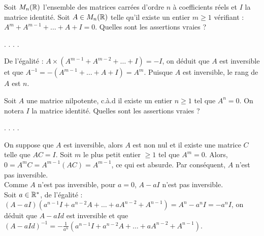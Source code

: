 \begin{question}
Soit $ M_n(\mathbb{R})$ l'ensemble des matrices carrées d'ordre $n$  à coefficients réels  et $I$ la matrice identité.
Soit $A \in M_n(\mathbb{R})$ telle qu'il existe un entier  $m \ge 1$ vérifiant :  $A^m+A^{m-1}+ \dots + A + I = 0$. Quelles sont les assertions vraies ?
\begin{answers}  
.
.
.
.
\end{answers}
\begin{explanations} De l'égalité : $A \times  (A^{m-1}+A^{m-2}+ \dots + I)= -I$, on déduit que  $A$ est inversible et que $A^{-1}=-(A^{m-1}+ \dots + A+I)=A^m$. Puisque $A$ est inversible, le rang de $A$ est $n$.
\end{explanations}
\end{question}

\begin{question}
Soit $A$ une matrice nilpotente, c.à.d il existe un entier $n\ge 1$ tel que $A^n=0$. On notera $I$ la matrice identité. Quelles sont les assertions vraies ?
\begin{answers}  
.
.
.
.   
\end{answers}
\begin{explanations} On suppose que $A$ est inversible, alors $A$ est non nul et il existe une matrice $C$ telle que $AC=I$. 
Soit $m$ le plus petit entier $\ge 1$ tel que $A^m=0$. Alors, $0=A^mC=A^{m-1}(AC)=A^{m-1}$, ce qui est absurde.
Par conséquent, $A$ n'est pas inversible.\\
Comme $A$ n'est pas inversible, pour $a=0$, $A-aI$ n'est pas inversible.\\
Soit $a\in \mathbb{R}^*$, de l'égalité : $(A-aI)(a^{n-1}I+a^{n-2}A+\dots + aA^{n-2}+A^{n-1})=A^n-a^nI=-a^nI$, on déduit que 
$A-aId$ est inversible et que 
$\displaystyle (A-aId)^{-1}=-\frac{1}{a^n}\left(a^{n-1}I+a^{n-2}A+\dots + aA^{n-2}+A^{n-1}\right)$.
\end{explanations}
\end{question}

